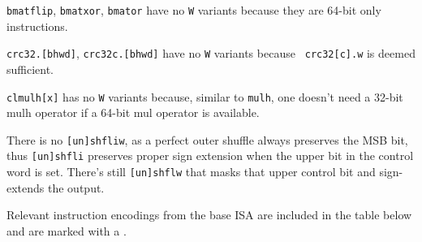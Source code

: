{\tt bmatflip}, {\tt bmatxor}, {\tt bmator} have no {\tt *W} variants because
they are 64-bit only instructions.

{\tt crc32.[bhwd]}, {\tt crc32c.[bhwd]} have no {\tt *W} variants because {\tt
crc32[c].w} is deemed sufficient.

{\tt clmulh[x]} has no {\tt *W} variants because, similar to {\tt mulh}, one
doesn't need a 32-bit mulh operator if a 64-bit mul operator is available.

There is no {\tt [un]shfliw}, as a perfect outer shuffle always preserves the
MSB bit, thus {\tt [un]shfli} preserves proper sign extension when the
upper bit in the control word is set. There's still {\tt [un]shflw} that
masks that upper control bit and sign-extends the output.

Relevant instruction encodings from the base ISA are included in the table below
and are marked with a {\tt *}.


